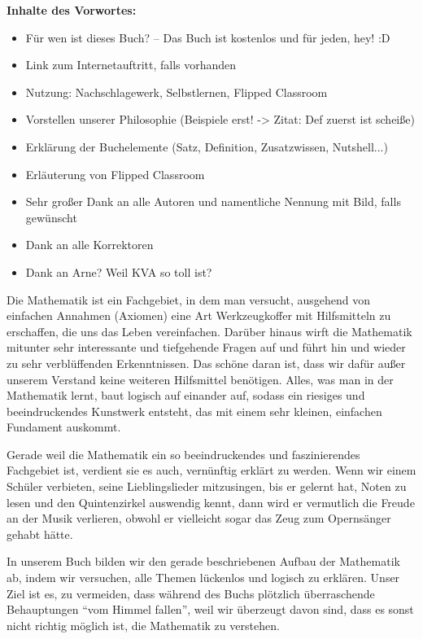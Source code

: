 \documentclass[../main.tex]{subfiles}
\begin{document}
\textbf{Inhalte des Vorwortes:}
\begin{itemize}
    \item Für wen ist dieses Buch? -- Das Buch ist kostenlos und für jeden, hey! :D
    \item Link zum Internetauftritt, falls vorhanden
    \item Nutzung: Nachschlagewerk, Selbstlernen, Flipped Classroom
    \item Vorstellen unserer Philosophie (Beispiele erst! -> Zitat: Def zuerst ist scheiße)
    \item Erklärung der Buchelemente (Satz, Definition, Zusatzwissen, Nutshell...)
    \item Erläuterung von Flipped Classroom
    \item Sehr großer Dank an alle Autoren und namentliche Nennung mit Bild, falls gewünscht
    \item Dank an alle Korrektoren
    \item Dank an Arne? Weil KVA so toll ist?
\end{itemize}
\fi

Die Mathematik ist ein Fachgebiet, in dem man versucht, ausgehend von einfachen Annahmen (Axiomen) eine Art Werkzeugkoffer mit Hilfsmitteln zu erschaffen, die uns das Leben vereinfachen. Darüber hinaus wirft die Mathematik mitunter sehr interessante und tiefgehende Fragen auf und führt hin und wieder zu sehr verblüffenden Erkenntnissen. Das schöne daran ist, dass wir dafür außer unserem Verstand keine weiteren Hilfsmittel benötigen. Alles, was man in der Mathematik lernt, baut logisch auf einander auf, sodass ein riesiges und beeindruckendes Kunstwerk entsteht, das mit einem sehr kleinen, einfachen Fundament auskommt.

Gerade weil die Mathematik ein so beeindruckendes und faszinierendes Fachgebiet ist, verdient sie es auch, vernünftig erklärt zu werden. Wenn wir einem Schüler verbieten, seine Lieblingslieder mitzusingen, bis er gelernt hat, Noten zu lesen und den Quintenzirkel auswendig kennt, dann wird er vermutlich die Freude an der Musik verlieren, obwohl er vielleicht sogar das Zeug zum Opernsänger gehabt hätte.

In unserem Buch bilden wir den gerade beschriebenen Aufbau der Mathematik ab, indem wir versuchen, alle Themen lückenlos und logisch zu erklären. Unser Ziel ist es, zu vermeiden, dass während des Buchs plötzlich überraschende Behauptungen \enquote{vom Himmel fallen}, weil wir überzeugt davon sind, dass es sonst nicht richtig möglich ist, die Mathematik zu verstehen.
\end{document}
